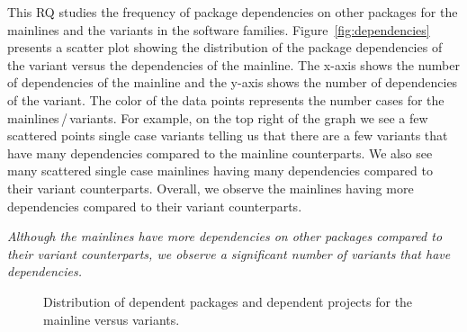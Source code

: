 This RQ studies the frequency of package dependencies on other packages for the mainlines and the variants in the software families. 
Figure~\ref{fig:dependencies} presents a scatter plot showing the distribution of the package dependencies of the variant versus the dependencies of the mainline.
The x-axis shows the number of dependencies of the mainline and
the y-axis shows the number of dependencies of the variant.
The color of the data points represents the number cases for the mainlines\,/\,variants.
For example, on the top right of the graph we see a few scattered points single case variants telling us that there are a few variants that have many dependencies compared to the mainline counterparts.
We also see many scattered single case mainlines having many dependencies compared to their variant counterparts. 
Overall, we observe the mainlines having more dependencies compared to their variant counterparts.

\begin{framed} 
\noindent
\emph{Although the mainlines have more dependencies on other packages compared to their variant counterparts, we observe a significant number of variants that have dependencies.}
\end{framed}

\begin{figure}[htbp]%
\vspace{-.3cm}
    \centering
    \qquad
    \caption{Distribution of dependent packages and dependent projects for the mainline versus variants.}%
    \label{fig:packages_and_projects}%
\end{figure}

